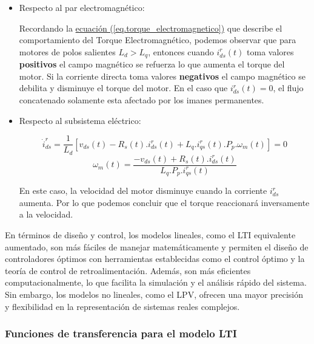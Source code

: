 \documentclass{article}
\begin{document}
\begin{itemize}
    
    \item Respecto al par electromagnético:
    
    Recordando la
    \hyperref[eq.torque_electromagnetico]{ecuación (\ref*{eq.torque_electromagnetico})}
    que describe el comportamiento del Torque Electromagnético,
    podemos observar que para motores de polos salientes $L_{d} > L_{q}$, entonces cuando $i_{ds}^r(t)$
    toma valores \textbf{positivos} el campo magnético se refuerza lo que aumenta el torque del
    motor. Si la corriente directa toma valores \textbf{negativos} el campo magnético se debilita 
    y disminuye el torque del motor. En el caso que $i_{ds}^r(t) = 0$, el flujo concatenado solamente esta afectado por 
    los imanes permanentes.

    \item Respecto al subsistema eléctrico:

    \begin{equation}
        \dot{i}_{ds}^r = \frac{1}{L_{d}}[v_{ds}(t) - R_{s}(t).i_{ds}^r(t) + L_{q}.i_{qs}^r(t).P_{p}.\omega_{m}(t)] = 0
    \end{equation}
    \begin{equation}
        \omega_{m}(t) = \frac{-v_{ds}(t) + R_{s}(t).i_{ds}^r(t)}{L_{q}.P_p.i_{qs}^r(t)}
    \end{equation}

    En este caso, la velocidad del motor disminuye cuando la corriente $i_{ds}^r$ 
    aumenta. Por lo que podemos concluir que el torque reaccionará inversamente 
    a la velocidad.

\end{itemize}

En términos de diseño y control, los modelos lineales, como el LTI equivalente aumentado, son más 
fáciles de manejar matemáticamente y permiten el diseño de controladores óptimos con herramientas 
establecidas como el control óptimo y la teoría de control de retroalimentación. Además, son más 
eficientes computacionalmente, lo que facilita la simulación y el análisis rápido del sistema. Sin 
embargo, los modelos no lineales, como el LPV, ofrecen una mayor precisión y flexibilidad en la 
representación de sistemas reales complejos.


\subsubsection{Funciones de transferencia para el modelo LTI}
\end{document}

